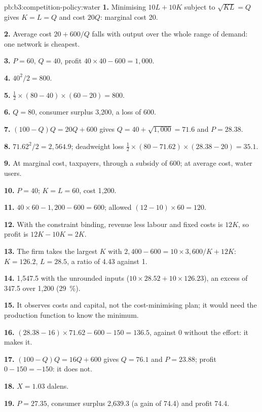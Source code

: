\begin{solution}{pb:b3:competition-policy:water}
\textbf{1.} Minimising $10L + 10K$ subject to $\sqrt{KL} = Q$ gives $K = L = Q$ and cost $20Q$: marginal cost 20.

\textbf{2.} Average cost $20 + 600/Q$ falls with output over the whole range of demand: one network
is cheapest.

\textbf{3.} $P = 60$, $Q = 40$, profit $40 \times 40 - 600 = 1{,}000$.

\textbf{4.} $40^2/2 = 800$.

\textbf{5.} $\tfrac12 \times (80 - 40) \times (60 - 20) = 800$.

\textbf{6.} $Q = 80$, consumer surplus 3{,}200, a loss of 600.

\textbf{7.} $(100 - Q)Q = 20Q + 600$ gives $Q = 40 + \sqrt{1{,}000} = 71.6$ and $P = 28.38$.

\textbf{8.} $71.62^2/2 = 2{,}564.9$; deadweight loss $\tfrac12 \times (80 - 71.62) \times (28.38 - 20) = 35.1$.

\textbf{9.} At marginal cost, taxpayers, through a subsidy of 600; at average cost, water users.

\textbf{10.} $P = 40$; $K = L = 60$, cost 1{,}200.

\textbf{11.} $40 \times 60 - 1{,}200 - 600 = 600$; allowed $(12 - 10) \times 60 = 120$.

\textbf{12.} With the constraint binding, revenue less labour and fixed costs is $12K$, so profit is
$12K - 10K = 2K$.

\textbf{13.} The firm takes the largest $K$ with $2{,}400 - 600 = 10 \times 3{,}600/K + 12K$: $K = 126.2$, $L = 28.5$, a ratio of 4.43 against 1.

\textbf{14.} 1{,}547.5 with the unrounded inputs ($10 \times 28.52 + 10 \times 126.23$), an excess of 347.5 over 1{,}200 (29~\%).

\textbf{15.} It observes costs and capital, not the cost-minimising plan; it would need the
production function to know the minimum.

\textbf{16.} $(28.38 - 16) \times 71.62 - 600 - 150 = 136.5$, against 0 without the effort: it makes it.

\textbf{17.} $(100 - Q)Q = 16Q + 600$ gives $Q = 76.1$ and $P = 23.88$; profit $0 - 150 = -150$: it does not.

\textbf{18.} $X = 1.03$ dalens.

\textbf{19.} $P = 27.35$, consumer surplus 2{,}639.3 (a gain of 74.4) and profit 74.4.


\end{solution}
